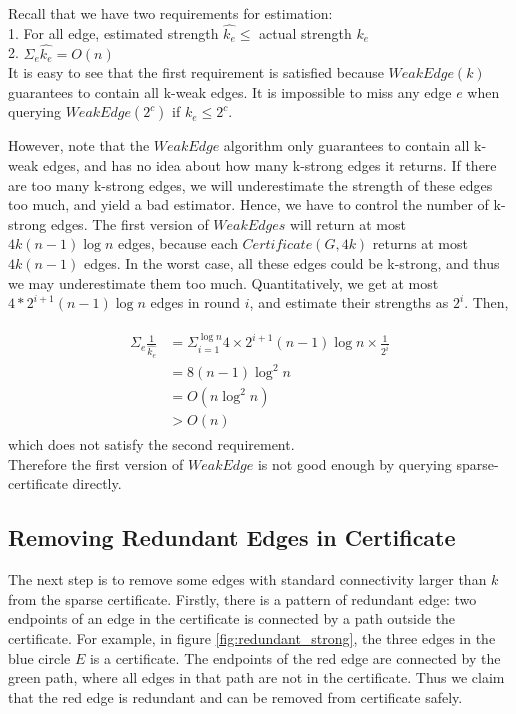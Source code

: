 \documentclass{article}
\begin{document}
Recall that we have two requirements for estimation: \\
1. For all edge, estimated strength $\hat{k_e} \leq$ actual strength $k_e$ \\
2. $\Sigma_e \hat{k_e} = O(n)$ \\

It is easy to see that the first requirement is satisfied because $WeakEdge(k)$ guarantees to contain all k-weak edges. It is impossible to miss any edge $e$ when querying $WeakEdge(2^c)$ if $k_e \leq 2^c$.

However, note that the $WeakEdge$ algorithm only guarantees to contain all k-weak edges, and has no idea about how many k-strong edges it returns. 
If there are too many k-strong edges, we will underestimate the strength of these edges too much, and yield a bad estimator. Hence, we have to control the number of k-strong edges. 
The first version of $WeakEdges$ will return at most $4k(n-1)\log n$ edges, because each $Certificate(G, 4k)$ returns at most $4k(n-1)$ edges. 
In the worst case, all these edges could be k-strong, and thus we may underestimate them too much. 
Quantitatively, we get at most  $4*2^{i+1}(n-1)\log n$ edges in round $i$, and estimate their strengths as $2^i$. Then, 

\begin{align}
    \begin{aligned}
        \Sigma_{e} \frac{1}{\hat{k_e}} & = \Sigma_{i = 1}^{\log n} 4 \times 2^{i+1}(n-1) \log n \times \frac{1}{2^i} \\
       & = 8(n-1) \log^2 n \\
       & = O(n \log^2 n) \\
       & > O(n) 
    \end{aligned}
\end{align}
which does not satisfy the second requirement. \\

Therefore the first version of $Weak Edge$ is not good enough by querying sparse-certificate directly.

\subsection{Removing Redundant Edges in Certificate}

The next step is to remove some edges with standard connectivity larger than $k$ from the sparse certificate.
Firstly, there is a pattern of redundant edge: two endpoints of an edge in the certificate is connected by a path outside the certificate. For example, in figure \ref{fig:redundant_strong}, the three edges in the blue circle $E$ is a certificate. The endpoints of the red edge are connected by the green path, where all edges in that path are not in the certificate. Thus we claim that the red edge is redundant and can be removed from certificate safely.
\end{document}
